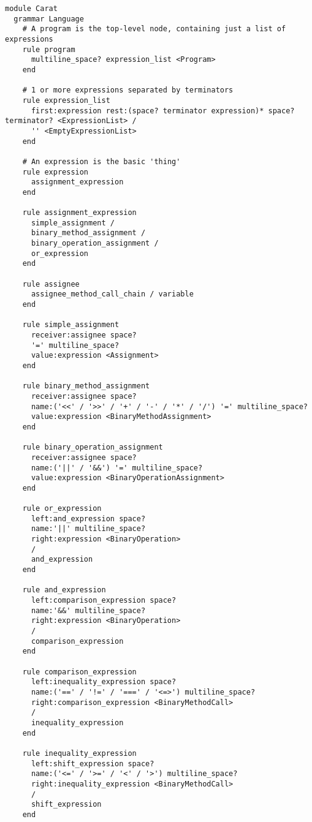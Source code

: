 \begin{lstlisting}[title={\small\ttfamily\bfseries parser/language.treetop},language=treetop]
module Carat
  grammar Language
    # A program is the top-level node, containing just a list of expressions
    rule program
      multiline_space? expression_list <Program>
    end
    
    # 1 or more expressions separated by terminators
    rule expression_list
      first:expression rest:(space? terminator expression)* space? terminator? <ExpressionList> /
      '' <EmptyExpressionList>
    end
    
    # An expression is the basic 'thing'
    rule expression
      assignment_expression
    end
    
    rule assignment_expression
      simple_assignment /
      binary_method_assignment /
      binary_operation_assignment /
      or_expression
    end
    
    rule assignee
      assignee_method_call_chain / variable
    end
    
    rule simple_assignment
      receiver:assignee space?
      '=' multiline_space?
      value:expression <Assignment>
    end
    
    rule binary_method_assignment
      receiver:assignee space?
      name:('<<' / '>>' / '+' / '-' / '*' / '/') '=' multiline_space?
      value:expression <BinaryMethodAssignment>
    end
    
    rule binary_operation_assignment
      receiver:assignee space?
      name:('||' / '&&') '=' multiline_space?
      value:expression <BinaryOperationAssignment>
    end
    
    rule or_expression
      left:and_expression space?
      name:'||' multiline_space?
      right:expression <BinaryOperation>
      /
      and_expression
    end
    
    rule and_expression
      left:comparison_expression space?
      name:'&&' multiline_space?
      right:expression <BinaryOperation>
      /
      comparison_expression
    end
    
    rule comparison_expression
      left:inequality_expression space?
      name:('==' / '!=' / '===' / '<=>') multiline_space?
      right:comparison_expression <BinaryMethodCall>
      /
      inequality_expression
    end
    
    rule inequality_expression
      left:shift_expression space?
      name:('<=' / '>=' / '<' / '>') multiline_space?
      right:inequality_expression <BinaryMethodCall>
      /
      shift_expression
    end
    

\end{lstlisting}
